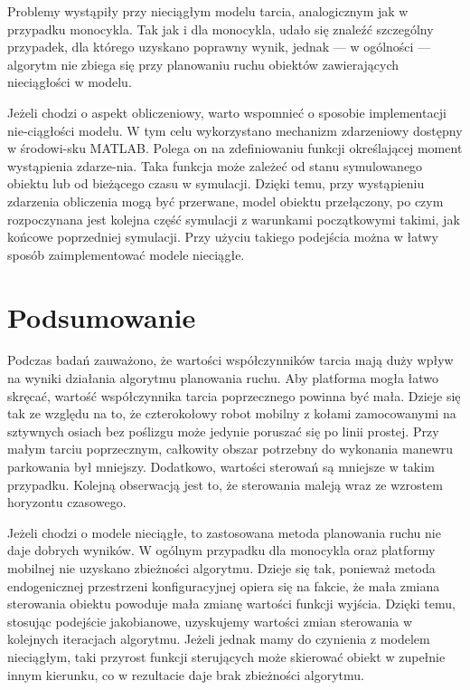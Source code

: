 Problemy wystąpiły przy nieciągłym modelu tarcia, analogicznym jak w przypadku monocykla. Tak jak i dla monocykla, udało się znaleźć szczególny przypadek, dla którego uzyskano poprawny wynik, jednak --- w ogólności --- algorytm nie zbiega się przy planowaniu ruchu obiektów zawierających nieciągłości w modelu.

Jeżeli chodzi o aspekt obliczeniowy, warto wspomnieć o sposobie implementacji nie-ciągłości modelu. W tym celu wykorzystano mechanizm zdarzeniowy dostępny w środowi-sku MATLAB. Polega on na zdefiniowaniu funkcji określającej moment wystąpienia zdarze-nia. Taka funkcja może zależeć od stanu symulowanego obiektu lub od bieżącego czasu w symulacji. Dzięki temu, przy wystąpieniu zdarzenia obliczenia mogą być przerwane, model obiektu przełączony, po czym rozpoczynana jest kolejna część symulacji z warunkami początkowymi takimi, jak końcowe poprzedniej symulacji. Przy użyciu takiego podejścia można w łatwy sposób zaimplementować modele nieciągłe.

\section{Podsumowanie}
\hspace{\parindent}Podczas badań zauważono, że wartości współczynników tarcia mają duży wpływ na wyniki działania algorytmu planowania ruchu. Aby platforma mogła łatwo skręcać, wartość współczynnika tarcia poprzecznego powinna być mała. Dzieje się tak ze względu na to, że czterokołowy robot mobilny z kołami zamocowanymi na sztywnych osiach bez poślizgu może jedynie poruszać się po linii prostej. Przy małym tarciu poprzecznym, całkowity obszar potrzebny do wykonania manewru parkowania był mniejszy. Dodatkowo, wartości sterowań są mniejsze w takim przypadku. Kolejną obserwacją jest to, że sterowania maleją wraz ze wzrostem horyzontu czasowego. 

Jeżeli chodzi o modele nieciągłe, to zastosowana metoda planowania ruchu nie daje dobrych wyników. W ogólnym przypadku dla monocykla oraz platformy mobilnej nie uzyskano zbieżności algorytmu. Dzieje się tak, ponieważ metoda endogenicznej przestrzeni konfiguracyjnej opiera się na fakcie, że mała zmiana sterowania obiektu powoduje mała zmianę wartości funkcji wyjścia. Dzięki temu, stosując podejście jakobianowe, uzyskujemy wartości zmian sterowania w kolejnych iteracjach algorytmu. Jeżeli jednak mamy do czynienia z modelem nieciągłym, taki przyrost funkcji sterujących może skierować obiekt w zupełnie innym kierunku, co w rezultacie daje brak zbieżności algorytmu.